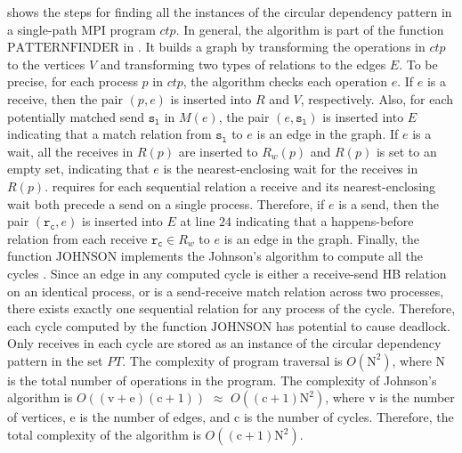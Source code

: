 shows the steps for finding all the instances of the circular dependency pattern in a single-path MPI program $\mathit{ctp}$. In general, the algorithm is part of the function $\mathrm{PATTERNFINDER}$ in . It builds a graph by transforming the operations in $\mathit{ctp}$ to the vertices $\mathit{V}$ and transforming two types of relations to the edges $\mathit{E}$. To be precise, for each process $p$ in $\mathit{ctp}$, the algorithm checks each operation $\mathit{e}$. 
If $\mathit{e}$ is a receive, then the pair $(p,\mathit{e})$ is inserted into $\mathit{R}$ and $\mathit{V}$, respectively. Also, for each potentially matched send $\mathtt{s_l}$ in $\mathit{M}(\mathit{e})$, the pair $(\mathit{e},\mathtt{s_l})$ is inserted into $\mathit{E}$ indicating that a match relation from $\mathtt{s_l}$ to $\mathit{e}$ is an edge in the graph. If $\mathit{e}$ is a wait, all the receives in $\mathit{R}(p)$ are inserted to $\mathit{R_w}(p)$ and $\mathit{R}(p)$ is set to an empty set, indicating that $\mathit{e}$ is the nearest-enclosing wait for the receives in $\mathit{R}(p)$.  requires for each sequential relation a receive and its nearest-enclosing wait both precede a send on a single process. Therefore, %
if $\mathit{e}$ is a send, then the pair $(\mathtt{r_c},\mathit{e})$ is inserted into $\mathit{E}$ at line $24$ indicating that a happens-before relation from each receive $\mathtt{r_c}\in\mathit{R_w}$ to $\mathit{e}$ is an edge in the graph. Finally, the function $\mathrm{JOHNSON}$ implements the Johnson's algorithm to compute all the cycles \cite{DBLP:journals/siamcomp/Johnson75}. Since an edge in any computed cycle is either a receive-send HB relation on an identical process, or is a send-receive match relation across two processes, there exists exactly one sequential relation for any process of the cycle. Therefore, each cycle computed by the function $\mathrm{JOHNSON}$ has potential to cause deadlock. Only receives in each cycle are stored as an instance of the circular dependency pattern in the set $\mathit{PT}$. The complexity of program traversal is $O(\mathrm{N}^2)$, where $\mathrm{N}$ is the total number of operations in the program. The complexity of Johnson's algorithm is $O((\mathrm{v}+\mathrm{e})(\mathrm{c}+1))$ $\approx$ $O((\mathrm{c}+1)\mathrm{N}^2)$, where $\mathrm{v}$ is the number of vertices, $\mathrm{e}$ is the number of edges, and $\mathrm{c}$ is the number of cycles. Therefore, the total complexity of the algorithm is $O((\mathrm{c}+1)\mathrm{N}^2)$.

